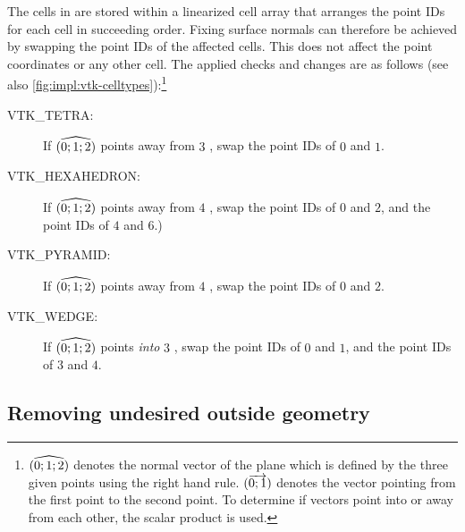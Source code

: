 The cells in \vtk are stored within a linearized cell array that arranges the point \acp{ID} for each cell in succeeding order. Fixing surface normals can therefore be achieved by swapping the point \acp{ID} of the affected cells. This does not affect the point coordinates or any other cell. The applied checks and changes are as follows (see also \autoref{fig:impl:vtk-celltypes}):\footnote{$\widehat{(0;1;2)}$ denotes the normal vector of the plane which is defined by the three given points using the right hand rule. $(\overrightarrow{0;1})$ denotes the vector pointing from the first point to the second point. To determine if vectors point into or away from each other, the scalar product is used.}

\begin{description}
%
	\item[VTK\_TETRA:] If $\widehat{(0;1;2)}$ points away from $3$%
, swap the point \acp{ID} of $0$ and $1$.
%
	\item[VTK\_HEXAHEDRON:] If $\widehat{(0;1;2)}$ points away from $4$%
	, swap the point \acp{ID} of $0$ and $2$, and the point \acp{ID} of $4$ and $6$.)
%
  \item[VTK\_PYRAMID:] If $\widehat{(0;1;2)}$ points away from $4$%
  , swap the point \acp{ID} of $0$ and $2$.
%
  \item[VTK\_WEDGE:] If $\widehat{(0;1;2)}$ points \emph{into} $3$%
  , swap the point \acp{ID} of $0$ and $1$, and the point \acp{ID} of $3$ and $4$.
%
\end{description}




\subsection{Removing undesired outside geometry}
\label{sec:impl:undesired-geometry}

